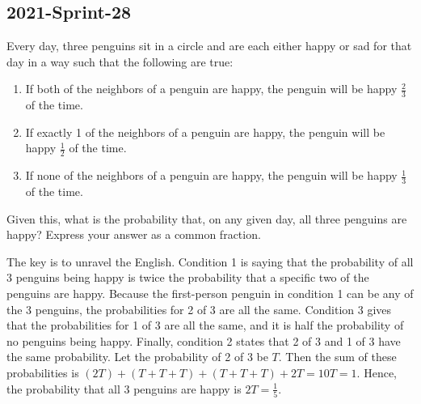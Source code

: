 \documentclass[12pt]{article}
\begin{document}
\subsection*{2021-Sprint-28}
Every day, three penguins sit in a circle and are each either happy or sad for that day in a way such that the following are true:
\begin{enumerate}
\item 
If both of the neighbors of a penguin are happy, the penguin will be happy $\frac{2}{3}$ of the time.
\item 
If exactly 1 of the neighbors of a penguin are happy, the penguin will be happy $\frac{1}{2}$ of the time.
\item 
If none of the neighbors of a penguin are happy, the penguin will be happy $\frac{1}{3}$ of the time.
\end{enumerate}
Given this, what is the probability that, on any given day, all three penguins are happy? Express your answer as a common fraction.
\begin{answer}
The key is to unravel the English. Condition 1 is saying that the probability of all 3 penguins being happy is twice the probability that a specific two of the penguins are happy. Because the first-person penguin in condition 1 can be any of the 3 penguins, the probabilities for 2 of 3 are all the same. Condition 3 gives that the probabilities for 1 of 3 are all the same, and it is half the probability of no penguins being happy. Finally, condition 2 states that 2 of 3 and 1 of 3 have the same probability. Let the probability of 2 of 3 be $T$. Then the sum of these probabilities is $(2T)+(T+T+T)+(T+T+T)+2T = 10T = 1$. Hence, the probability that all 3 penguins are happy is $2T = \boxed{\frac{1}{5}}$.
\end{answer}

\end{document}
